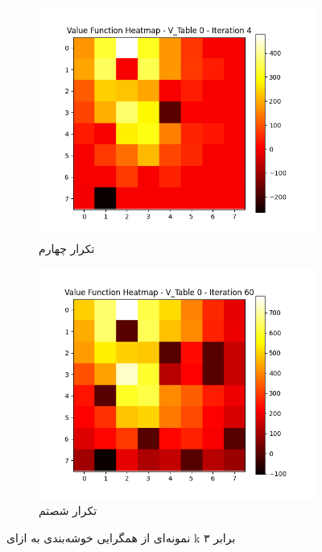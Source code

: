 \documentclass[11pt, a4paper, oneside]{report}
\begin{document}
\begin{figure}[H]
		\medskip
		\begin{subfigure}{0.40\textwidth}
			\includegraphics[width=\textwidth]{./images/iter4}
			\caption{تکرار چهارم}
			\label{fig:k}
		\end{subfigure}
		\hfill
		\begin{subfigure}{0.40\textwidth}
			\includegraphics[width=\textwidth]{./images/iter60}
			\caption{تکرار شصتم}
			\label{fig:l}
		\end{subfigure}
		
		\caption{نمونه‌ای از همگرایی خوشه‌بندی به ازای k برابر ۳ }
		\label{Clustering}
		
	\end{figure}
	
\end{document}
